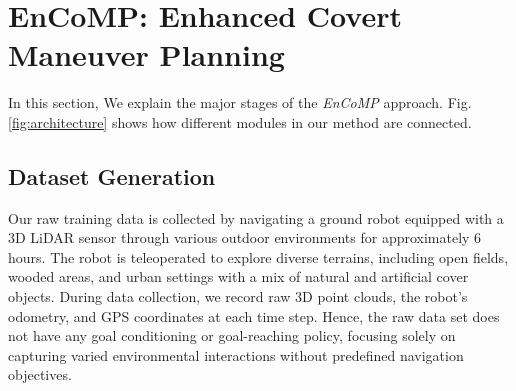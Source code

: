 \section{EnCoMP: Enhanced Covert Maneuver Planning}
\label{encomp_approach}
In this section, We explain the major stages of the \textit{EnCoMP} approach. Fig. \ref{fig:architecture} shows how different modules in our method are connected. 

\subsection{Dataset Generation}
Our raw training data is collected by navigating a ground robot equipped with a 3D LiDAR sensor through various outdoor environments for approximately 6 hours. The robot is teleoperated to explore diverse terrains, including open fields, wooded areas, and urban settings with a mix of natural and artificial cover objects. During data collection, we record raw 3D point clouds, the robot's odometry, and GPS coordinates at each time step. Hence, the raw data set does not have any goal conditioning or goal-reaching policy, focusing solely on capturing varied environmental interactions without predefined navigation objectives.

